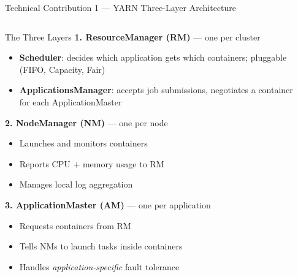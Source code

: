 \documentclass[aspectratio=169,10pt]{beamer}
\begin{document}
\begin{frame}{Technical Contribution 1 — YARN Three-Layer Architecture}
  \begin{columns}[T]
      \begin{block}{The Three Layers}
        \textbf{1. ResourceManager (RM)} — one per cluster\\
        \begin{itemize}
          \item \textbf{Scheduler}: decides which application gets
                which containers; pluggable (FIFO, Capacity, Fair)
          \item \textbf{ApplicationsManager}: accepts job submissions,
                negotiates a container for each ApplicationMaster
        \end{itemize}
        \vspace{4pt}
        \textbf{2. NodeManager (NM)} — one per node\\
        \begin{itemize}
          \item Launches and monitors containers
          \item Reports CPU + memory usage to RM
          \item Manages local log aggregation
        \end{itemize}
        \vspace{4pt}
        \textbf{3. ApplicationMaster (AM)} — one per application\\
        \begin{itemize}
          \item Requests containers from RM
          \item Tells NMs to launch tasks inside containers
          \item Handles \emph{application-specific} fault tolerance
        \end{itemize}
      \end{block}

      \begin{center}
\end{center}
\end{columns}
\end{frame}
\end{document}
